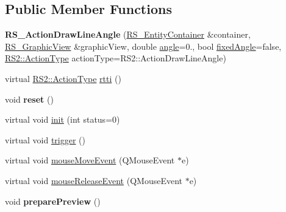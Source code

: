 \subsection*{Public Member Functions}
\begin{DoxyCompactItemize}
\item 
\hypertarget{classRS__ActionDrawLineAngle_af6e5a2b624f5172f8ba390f64bce0211}{{\bfseries R\-S\-\_\-\-Action\-Draw\-Line\-Angle} (\hyperlink{classRS__EntityContainer}{R\-S\-\_\-\-Entity\-Container} \&container, \hyperlink{classRS__GraphicView}{R\-S\-\_\-\-Graphic\-View} \&graphic\-View, double \hyperlink{classRS__ActionDrawLineAngle_a52b9926296010039d78a056e4c3408cc}{angle}=0., bool \hyperlink{classRS__ActionDrawLineAngle_a55aac1522eca70558ac4136f06dc3a82}{fixed\-Angle}=false, \hyperlink{classRS2_afe3523e0bc41fd637b892321cfc4b9d7}{R\-S2\-::\-Action\-Type} action\-Type=R\-S2\-::\-Action\-Draw\-Line\-Angle)}\label{classRS__ActionDrawLineAngle_af6e5a2b624f5172f8ba390f64bce0211}

\item 
virtual \hyperlink{classRS2_afe3523e0bc41fd637b892321cfc4b9d7}{R\-S2\-::\-Action\-Type} \hyperlink{classRS__ActionDrawLineAngle_a6d4b4a536c1e56f80b5ce495ee10d63b}{rtti} ()
\item 
\hypertarget{classRS__ActionDrawLineAngle_add623fea086dd3acb1897519ec35032f}{void {\bfseries reset} ()}\label{classRS__ActionDrawLineAngle_add623fea086dd3acb1897519ec35032f}

\item 
virtual void \hyperlink{classRS__ActionDrawLineAngle_ac3b42dca18f8ca55990ab4a88e4fe4d2}{init} (int status=0)
\item 
virtual void \hyperlink{classRS__ActionDrawLineAngle_a2e2cd55786d5b50058a28ec545493b5c}{trigger} ()
\item 
virtual void \hyperlink{classRS__ActionDrawLineAngle_a644f5734d0fb4b8f690d69af5b5fb049}{mouse\-Move\-Event} (Q\-Mouse\-Event $\ast$e)
\item 
virtual void \hyperlink{classRS__ActionDrawLineAngle_ae111c461d8ffa79e6c1170791b775d0e}{mouse\-Release\-Event} (Q\-Mouse\-Event $\ast$e)
\item 
\hypertarget{classRS__ActionDrawLineAngle_a807dbdb5f110c0c9d399d48cda99b222}{void {\bfseries prepare\-Preview} ()}\label{classRS__ActionDrawLineAngle_a807dbdb5f110c0c9d399d48cda99b222}


\end{DoxyCompactItemize}

